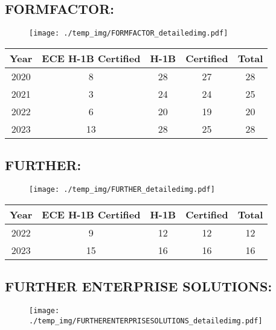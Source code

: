 \documentclass{article}%
\begin{document}
%
\newpage%
\subsection{FORMFACTOR:}%
\label{subsec:FORMFACTOR}%
\label{FORMFACTORdetailed}%


\begin{figure}[htbp]%
\centering%
\texttt{[image: ./temp\_img/FORMFACTOR\_detailedimg.pdf]}%
\end{figure}

%
\begin{longtable}{c|c|c|c|c}%
\hline%
Year&ECE H{-}1B Certified&H{-}1B&Certified&Total\\%
\hline%
2020&8&28&27&28\\%
\hline%
2021&3&24&24&25\\%
\hline%
2022&6&20&19&20\\%
\hline%
2023&13&28&25&28\\%
\hline%
\end{longtable}

%
\newpage%
\subsection{FURTHER:}%
\label{subsec:FURTHER}%
\label{FURTHERdetailed}%


\begin{figure}[htbp]%
\centering%
\texttt{[image: ./temp\_img/FURTHER\_detailedimg.pdf]}%
\end{figure}

%
\begin{longtable}{c|c|c|c|c}%
\hline%
Year&ECE H{-}1B Certified&H{-}1B&Certified&Total\\%
\hline%
2022&9&12&12&12\\%
\hline%
2023&15&16&16&16\\%
\hline%
\end{longtable}

%
\newpage%
\subsection{FURTHER ENTERPRISE SOLUTIONS:}%
\label{subsec:FURTHERENTERPRISESOLUTIONS}%
\label{FURTHERENTERPRISESOLUTIONSdetailed}%


\begin{figure}[htbp]%
\centering%
\texttt{[image: ./temp\_img/FURTHERENTERPRISESOLUTIONS\_detailedimg.pdf]}%
\end{figure}
\end{document}
